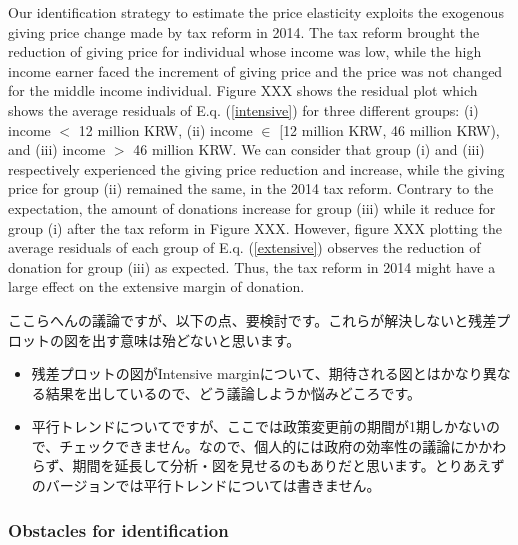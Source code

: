 \documentclass[ review  , 3p ]{elsarticle}
\providecommand{\tightlist}{%
  \setlength{\itemsep}{0pt}\setlength{\parskip}{0pt}}
\begin{document}
  Our identification strategy to estimate the price elasticity exploits the exogenous giving price change made by tax reform in 2014. The tax reform brought the reduction of giving price for individual whose income was low, while the high income earner faced the increment of giving price and the price was not changed for the middle income individual. Figure XXX shows the residual plot which shows the average residuals of E.q. (\ref{intensive}) for three different groups: (i) income \(<\) 12 million KRW, (ii) income \(\in\) {[}12 million KRW, 46 million KRW), and (iii) income \(>\) 46 million KRW. We can consider that group (i) and (iii) respectively experienced the giving price reduction and increase, while the giving price for group (ii) remained the same, in the 2014 tax reform. Contrary to the expectation, the amount of donations increase for group (iii) while it reduce for group (i) after the tax reform in Figure XXX. However, figure XXX plotting the average residuals of each group of E.q. (\ref{extensive}) observes the reduction of donation for group (iii) as expected. Thus, the tax reform in 2014 might have a large effect on the extensive margin of donation.
  
  ここらへんの議論ですが、以下の点、要検討です。これらが解決しないと残差プロットの図を出す意味は殆どないと思います。
  
  \begin{itemize}
  \tightlist
  \item
    残差プロットの図がIntensive marginについて、期待される図とはかなり異なる結果を出しているので、どう議論しようか悩みどころです。
  \item
    平行トレンドについてですが、ここでは政策変更前の期間が1期しかないので、チェックできません。なので、個人的には政府の効率性の議論にかかわらず、期間を延長して分析・図を見せるのもありだと思います。とりあえずのバージョンでは平行トレンドについては書きません。
  \end{itemize}
  
  \hypertarget{obstacles-for-identification}{%
  \subsubsection{Obstacles for identification}\label{obstacles-for-identification}}
  
\end{document}
